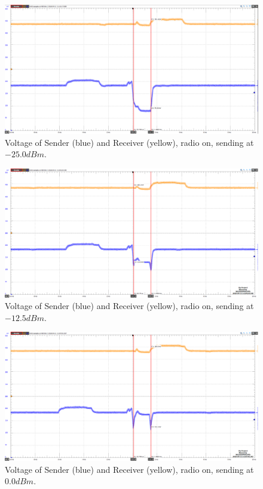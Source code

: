 \begin{figure}[H]
	\centering
	\includegraphics[width=0.8\linewidth]{implementation/energylab/fig/radioOn_sendLowSignal.png}
	\caption{Voltage of Sender (blue) and Receiver (yellow), radio on, sending at $-25.0dBm$.}
	\label{fig:radioOn_sendLowSignal}
\end{figure}

\begin{figure}[H]
	\centering
	\includegraphics[width=0.8\linewidth]{implementation/energylab/fig/radioOn_sendMidSignal.png}
	\caption{Voltage of Sender (blue) and Receiver (yellow), radio on, sending at $-12.5dBm$.}
	\label{fig:radioOn_sendMidSignal}
\end{figure}

\begin{figure}[H]
	\centering
	\includegraphics[width=0.8\linewidth]{implementation/energylab/fig/radioOn_sendHighSignal.png}
	\caption{Voltage of Sender (blue) and Receiver (yellow), radio on, sending at $0.0dBm$.}
	\label{fig:radioOn_sendHighSignal}
\end{figure}

